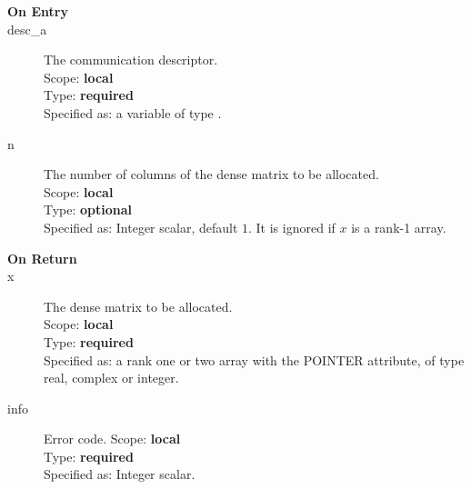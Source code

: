 

%
%


\begin{description}
\item[\bf On Entry]
\item[desc\_a] The communication descriptor.\\
Scope: {\bf local} \\
Type: {\bf required}\\
Specified as: a variable of type \descdata.\\
\item[n] The number of columns of the dense matrix to be allocated.\\
Scope: {\bf local} \\
Type: {\bf optional}\\
Specified as: Integer scalar, default $1$. It is ignored if $x$ is a
rank-1 array. 
\end{description}

\begin{description}
\item[\bf On Return]
\item[x] The dense matrix to be allocated.\\
Scope: {\bf local} \\
Type: {\bf required}\\
Specified as: a rank one or two array with the POINTER
attribute, of type real, complex or integer.\\
\item[info] Error code.
Scope: {\bf local} \\
Type: {\bf required}\\
Specified as: Integer scalar.
\end{description}


%
%

